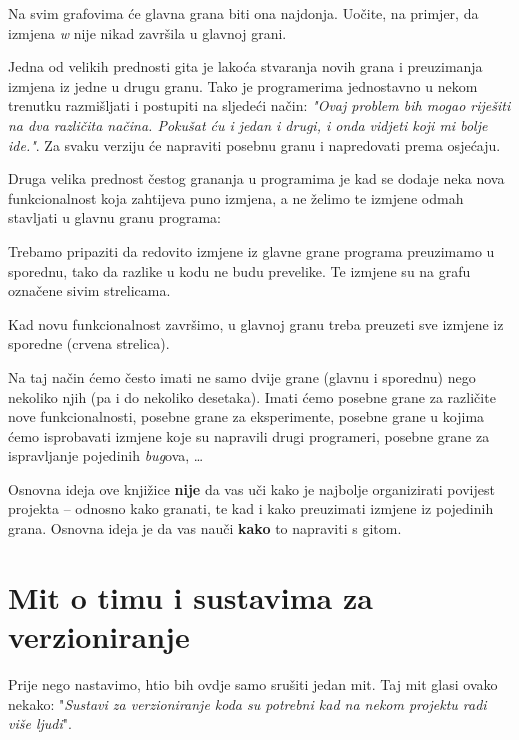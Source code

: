

Na svim grafovima će glavna grana biti ona najdonja.
Uočite, na primjer, da izmjena \emph w nije nikad završila u glavnoj grani. 

Jedna od velikih prednosti gita je lakoća stvaranja novih grana i preuzimanja izmjena iz jedne u drugu granu. 
Tako je programerima jednostavno u nekom trenutku razmišljati i postupiti na sljedeći način: \emph{"Ovaj problem bih mogao riješiti na dva različita načina. Pokušat ću i jedan i drugi, i onda vidjeti koji mi bolje ide."}. Za svaku verziju će napraviti posebnu granu i napredovati prema osjećaju.

Druga velika prednost čestog grananja u programima je kad se dodaje neka nova funkcionalnost koja zahtijeva puno izmjena, a ne želimo te izmjene odmah stavljati u glavnu granu programa:



Trebamo pripaziti da redovito izmjene iz glavne grane programa preuzimamo u sporednu, tako da razlike u kodu ne budu prevelike. 
Te izmjene su na grafu označene sivim strelicama.

Kad novu funkcionalnost završimo, u glavnoj granu treba preuzeti sve izmjene iz sporedne (crvena strelica).

Na taj način ćemo često imati ne samo dvije grane (glavnu i sporednu) nego nekoliko njih (pa i do nekoliko desetaka). 
Imati ćemo posebne grane za različite nove funkcionalnosti, posebne grane za eksperimente, posebne grane u kojima ćemo isprobavati izmjene koje su napravili drugi programeri, posebne grane za ispravljanje pojedinih \emph{bug}ova, \dots

Osnovna ideja ove knjižice \textbf{nije} da vas uči kako je najbolje organizirati povijest projekta -- odnosno kako granati, te kad i kako preuzimati izmjene iz pojedinih grana.
Osnovna ideja je da vas nauči \textbf{kako} to napraviti s gitom. 

\section*{Mit o timu i sustavima za verzioniranje}

Prije nego nastavimo, htio bih ovdje samo srušiti jedan mit. 
Taj mit glasi ovako nekako: "\emph{Sustavi za verzioniranje koda su potrebni kad na nekom projektu radi više ljudi}".

